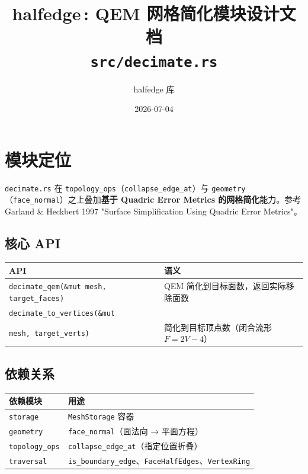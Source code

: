 \documentclass[11pt,a4paper]{article}
\title{\textbf{halfedge\,: QEM 网格简化模块设计文档} \\ \large \texttt{src/decimate.rs}}
\author{halfedge 库}
\date{2026-07-04}
\begin{document}
\maketitle
\tableofcontents

\section{模块定位}

\texttt{decimate.rs} 在 \texttt{topology\_ops}（\texttt{collapse\_edge\_at}）与
\texttt{geometry}（\texttt{face\_normal}）之上叠加\textbf{基于 Quadric Error Metrics
的网格简化}能力。参考 Garland \& Heckbert 1997 "Surface Simplification Using
Quadric Error Metrics"。

\subsection{核心 API}

\begin{center}
\renewcommand{\arraystretch}{1.18}
\begin{tabular}{@{}lp{8.5cm}@{}}
  \toprule
  \textbf{API} & \textbf{语义} \\
  \midrule
  \texttt{decimate\_qem(\&mut mesh, target\_faces)} & QEM 简化到目标面数，返回实际移除面数 \\
  \texttt{decimate\_to\_vertices(\&mut} \\
  \texttt{\quad mesh, target\_verts)} & 简化到目标顶点数（闭合流形 $F = 2V - 4$） \\
  \bottomrule
\end{tabular}
\end{center}

\subsection{依赖关系}

\begin{center}
\begin{tabular}{@{}ll@{}}
  \toprule
  \textbf{依赖模块} & \textbf{用途} \\
  \midrule
  \texttt{storage} & \texttt{MeshStorage} 容器 \\
  \texttt{geometry} & \texttt{face\_normal}（面法向 → 平面方程） \\
  \texttt{topology\_ops} & \texttt{collapse\_edge\_at}（指定位置折叠） \\
  \texttt{traversal} & \texttt{is\_boundary\_edge}、\texttt{FaceHalfEdges}、\texttt{VertexRing} \\
  \bottomrule
\end{tabular}
\end{center}
\end{document}
